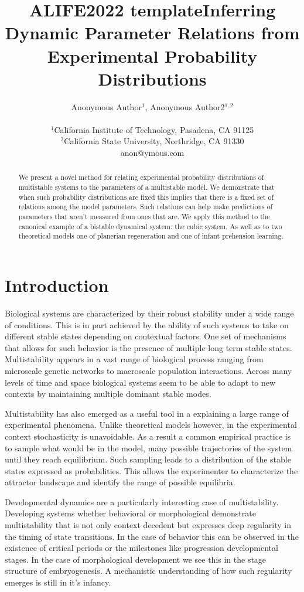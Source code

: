 \documentclass[letterpaper]{article}
\title{ALIFE2022 template}
\title{Inferring Dynamic Parameter Relations from Experimental Probability Distributions}
\author{Anonymous Author$^{1}$, Anonymous Author2$^{1,2}$ \\
\mbox{}\\
$^1$California Institute of Technology, Pasadena, CA 91125 \\
$^2$California State University, Northridge, CA 91330 \\
anon@ymous.com} %
\begin{document}
\maketitle

\begin{abstract}
    We present a novel method for relating experimental probability
    distributions of multistable systems to the parameters of a
    multistable model. We demonstrate that when such probability 
    distributions are fixed this implies that there is a fixed
    set of relations among the model parameters. Such relations 
    can help make predictions of parameters that aren't measured
    from ones that are. We apply this method
    to the canonical example of a bistable dynamical system: the cubic
    system.
    As well as to two theoretical models one of planerian regeneration
    and one of infant prehension learning.
\end{abstract}

\section{Introduction}
Biological systems are characterized by their robust stability under
a wide range of conditions. This is in part achieved by the ability
of such systems to take on different stable states
depending on contextual factors. One set of mechanisms that allows for such 
behavior is the presence of multiple long term stable states. Multistability
appears in a vast range of biological process ranging from microscale
genetic networks to macroscale population interactions. Across many levels 
of time and space biological systems seem to be able to adapt to new contexts
by maintaining multiple dominant stable modes.

Multistability has also
emerged as a useful tool in a explaining a large range of experimental phenomena.
Unlike theoretical models however, in the experimental context stochasticity
is unavoidable. As a result a common empirical practice is to sample what 
would be in the model, many possible trajectories of the system until they
reach equilibrium. 
Such sampling leads to a distribution of the stable states expressed as 
probabilities. This allows the experimenter to characterize the attractor
landscape and identify the range of possible equilibria.

Developmental dynamics are a particularly interesting case of multistability. 
Developing systems whether behavioral or morphological demonstrate multistability 
that is not only context decedent but expresses deep regularity in the timing of 
state transitions. In the case of behavior this can be observed in the existence
of critical periods or the milestones like progression developmental stages. 
In the case of morphological development we see this in the stage structure of
embryogenesis. A mechanistic understanding of how such regularity emerges is 
still in it's infancy.
\end{document}
